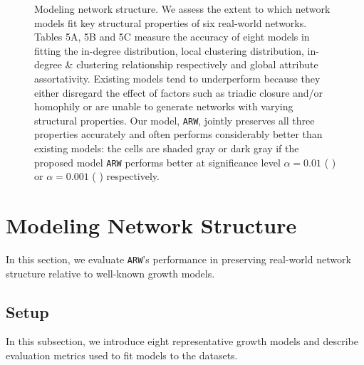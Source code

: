
\begin{figure*}[t]
	\vspace{-15pt}
	\centering
	\vspace{-16pt}
	\caption{
		Modeling network structure. We assess the extent to which network models
		fit key structural properties of six real-world networks. Tables 5A, 5B and 5C
		measure the accuracy of eight models in fitting the in-degree distribution,
		local clustering distribution, in-degree \& clustering relationship
		respectively and global attribute assortativity.
		Existing models tend to underperform because they either disregard
		the effect of factors such as triadic closure and/or homophily
		or are unable to generate networks with varying structural properties.
		Our model, \texttt{ARW}, jointly preserves all three properties accurately and often
		performs considerably better than existing models:
		the cells are shaded gray or dark gray if the proposed model \texttt{ARW} performs
		better at significance level $\alpha=0.01$ ( \lightgraybg{ }) or $\alpha=0.001$ ( \darkgraybg{ })
		respectively.
	}
	\vspace{-10pt}
	\label{fig:exp_table}
\end{figure*}

\section{Modeling Network Structure}
\label{sec:Experiments}
In this section, we evaluate \texttt{ARW}'s performance in preserving
real-world network structure relative to well-known growth models.

\subsection{Setup}
\label{sub:Experimental Setup}

In this subsection, we introduce eight representative growth models
and describe evaluation metrics used to fit models to the datasets.

